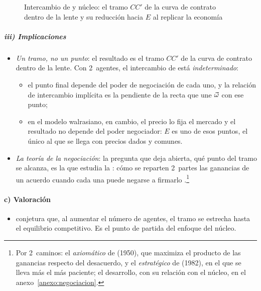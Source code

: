 \documentclass[11pt]{article}
\begin{document}
\begin{figure}[H]
\centering
\caption{Intercambio de  y núcleo: el tramo $CC'$ de la curva de contrato dentro de la lente y su reducción hacia $E$ al replicar la economía}\label{fig:caja-intercambio-nucleo}
\end{figure}

\subparagraph{iii) Implicaciones}

\begin{itemize}
\item \emph{Un tramo, no un punto}: el resultado es el tramo $CC'$ de la curva de contrato dentro de la lente. Con 2~agentes, el intercambio de  está \emph{indeterminado}:
  \begin{itemize}
  \item el punto final depende del poder de negociación de cada uno, y la relación de intercambio implícita es la pendiente de la recta que une $\vec{\omega}$ con ese punto;
  \item en el modelo walrasiano, en cambio, el precio lo fija el mercado y el resultado no depende del poder negociador: $E$ es uno de esos puntos, el único al que se llega con precios dados y comunes.
  \end{itemize}
\item \emph{La teoría de la negociación}: la pregunta que  deja abierta, qué punto del tramo se alcanza, es la que estudia la : cómo se reparten 2~partes las ganancias de un acuerdo cuando cada una puede negarse a firmarlo .\footnote{Por 2~caminos: el \emph{axiomático} de  (1950), que maximiza el producto de las ganancias respecto del desacuerdo, y el \emph{estratégico} de  (1982), en el que se lleva más el más paciente; el desarrollo, con su relación con el núcleo, en el anexo~\ref{anexo:negociacion}.}
\end{itemize}

\paragraph{c) Valoración}

\begin{itemize}
\item {} conjetura que, al aumentar el número de agentes, el tramo se estrecha hasta el equilibrio competitivo. Es el punto de partida del enfoque del núcleo.
\end{itemize}
\end{document}
